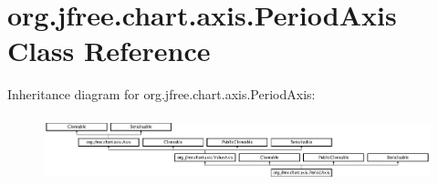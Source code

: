 \hypertarget{classorg_1_1jfree_1_1chart_1_1axis_1_1_period_axis}{}\section{org.\+jfree.\+chart.\+axis.\+Period\+Axis Class Reference}
\label{classorg_1_1jfree_1_1chart_1_1axis_1_1_period_axis}
Inheritance diagram for org.\+jfree.\+chart.\+axis.\+Period\+Axis\+:\begin{figure}[H]
\begin{center}
\leavevmode
\includegraphics[height=1.934370cm]{classorg_1_1jfree_1_1chart_1_1axis_1_1_period_axis}
\end{center}
\end{figure}
